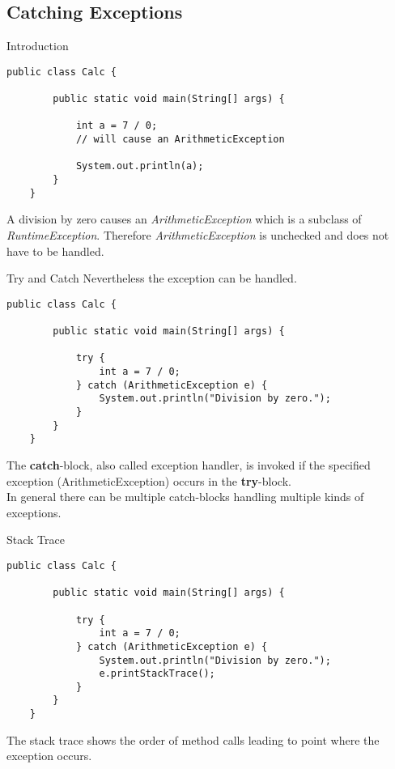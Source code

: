\subsection{Catching Exceptions}    
\begin{frame}[fragile]{Introduction}
    \begin{lstlisting}[basicstyle=\ttfamily\scriptsize]
    public class Calc {
    
        public static void main(String[] args) {
    
            int a = 7 / 0;
            // will cause an ArithmeticException
            
            System.out.println(a);
        }
    }
    \end{lstlisting}
    A division by zero causes an \emph{ArithmeticException} which is a subclass of \emph{RuntimeException}. 
    Therefore \emph{ArithmeticException} is unchecked and does not have to be handled.
\end{frame}

\begin{frame}[fragile]{Try and Catch}
    Nevertheless the exception can be handled.
    \begin{lstlisting}[basicstyle=\ttfamily\scriptsize]
    public class Calc {
    
        public static void main(String[] args) {
    
            try {
                int a = 7 / 0;
            } catch (ArithmeticException e) {
                System.out.println("Division by zero.");
            }
        }
    }
    \end{lstlisting}
    The \textbf{catch}-block, also called exception handler,
    is invoked if the specified exception (ArithmeticException) occurs in the \textbf{try}-block.\\
    In general there can be multiple catch-blocks handling multiple kinds of exceptions.
\end{frame}

\begin{frame}[fragile]{Stack Trace}
    \begin{lstlisting}[basicstyle=\ttfamily\scriptsize]
    public class Calc {
    
        public static void main(String[] args) {
    
            try {
                int a = 7 / 0;
            } catch (ArithmeticException e) {
                System.out.println("Division by zero.");
                e.printStackTrace();
            }
        }
    }
    \end{lstlisting}
    The stack trace shows the order of method calls leading to point where the exception occurs.
\end{frame}

